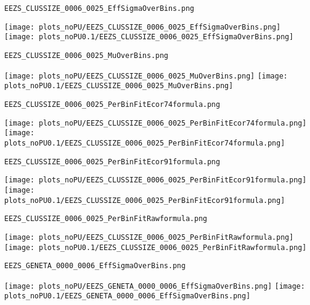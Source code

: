 \begin{frame}[fragile]
\begin{verbatim}
EEZS_CLUSSIZE_0006_0025_EffSigmaOverBins.png
\end{verbatim}
\texttt{[image: plots\_noPU/EEZS\_CLUSSIZE\_0006\_0025\_EffSigmaOverBins.png]}
\texttt{[image: plots\_noPU0.1/EEZS\_CLUSSIZE\_0006\_0025\_EffSigmaOverBins.png]}
\end{frame}
\begin{frame}[fragile]
\begin{verbatim}
EEZS_CLUSSIZE_0006_0025_MuOverBins.png
\end{verbatim}
\texttt{[image: plots\_noPU/EEZS\_CLUSSIZE\_0006\_0025\_MuOverBins.png]}
\texttt{[image: plots\_noPU0.1/EEZS\_CLUSSIZE\_0006\_0025\_MuOverBins.png]}
\end{frame}
\begin{frame}[fragile]
\begin{verbatim}
EEZS_CLUSSIZE_0006_0025_PerBinFitEcor74formula.png
\end{verbatim}
\texttt{[image: plots\_noPU/EEZS\_CLUSSIZE\_0006\_0025\_PerBinFitEcor74formula.png]}
\texttt{[image: plots\_noPU0.1/EEZS\_CLUSSIZE\_0006\_0025\_PerBinFitEcor74formula.png]}
\end{frame}
\begin{frame}[fragile]
\begin{verbatim}
EEZS_CLUSSIZE_0006_0025_PerBinFitEcor91formula.png
\end{verbatim}
\texttt{[image: plots\_noPU/EEZS\_CLUSSIZE\_0006\_0025\_PerBinFitEcor91formula.png]}
\texttt{[image: plots\_noPU0.1/EEZS\_CLUSSIZE\_0006\_0025\_PerBinFitEcor91formula.png]}
\end{frame}
\begin{frame}[fragile]
\begin{verbatim}
EEZS_CLUSSIZE_0006_0025_PerBinFitRawformula.png
\end{verbatim}
\texttt{[image: plots\_noPU/EEZS\_CLUSSIZE\_0006\_0025\_PerBinFitRawformula.png]}
\texttt{[image: plots\_noPU0.1/EEZS\_CLUSSIZE\_0006\_0025\_PerBinFitRawformula.png]}
\end{frame}
\begin{frame}[fragile]
\begin{verbatim}
EEZS_GENETA_0000_0006_EffSigmaOverBins.png
\end{verbatim}
\texttt{[image: plots\_noPU/EEZS\_GENETA\_0000\_0006\_EffSigmaOverBins.png]}
\texttt{[image: plots\_noPU0.1/EEZS\_GENETA\_0000\_0006\_EffSigmaOverBins.png]}
\end{frame}
